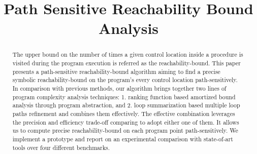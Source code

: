 \documentclass[runningheads]{llncs}
\begin{document}
%
\title{Path Sensitive Reachability Bound Analysis}
%
%
%

\maketitle              

%
\begin{abstract}
    The upper bound on the number of times a given control location 
    inside a procedure is visited during the program execution is referred as the reachability-bound.
    This paper presents a path-sensitive reachability-bound algorithm
    aiming to find a precise symbolic reachability-bound on the program's every control location path-sensitively.
    In comparison with previous methods, our algorithm brings together two lines of program complexity analysis techniques:
    1. ranking function based amortized bound analysis through program abstraction, and
    2. loop summarization based multiple loop paths refinement
    and combines them effectively. 
    The effective combination leverages the precision and efficiency trade-off comparing to adopt either one of them.
    It allows us to compute precise reachability-bound on each program point path-sensitively.
    We implement a prototype and report on an experimental comparison with state-of-art tools over four different benchmarks.
\end{abstract}
%
%
%
\end{document}
